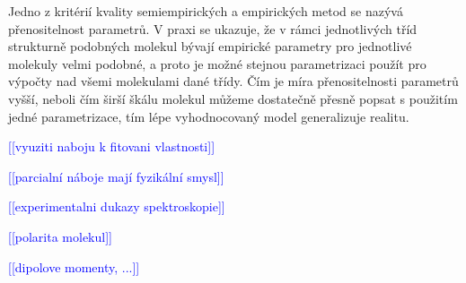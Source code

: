 \documentclass[10pt,draft,oneside]{fithesis2}
\newcommand\todo[1]{\textcolor{blue}{[[#1]]}}
\begin{document}
Jedno z kritérií kvality semiempirických a empirických metod se nazývá přenositelnost parametrů. V praxi se ukazuje, že v rámci jednotlivých tříd strukturně podobných molekul bývají empirické parametry pro jednotlivé molekuly velmi podobné, a proto je možné stejnou parametrizaci použít pro výpočty nad všemi molekulami dané třídy. Čím je míra přenositelnosti parametrů vyšší, neboli čím širší škálu molekul můžeme dostatečně přesně popsat s použitím jedné parametrizace, tím lépe vyhodnocovaný model generalizuje realitu.






\todo{vyuziti naboju k fitovani vlastnosti}




\todo{parcialní náboje mají fyzikální smysl}

\todo{experimentalni dukazy spektroskopie}

\todo{polarita molekul}

\todo{dipolove momenty, ...}


\end{document}

